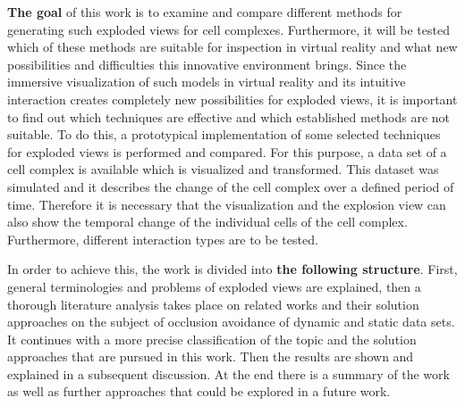 \textbf{The goal} of this work is to examine and compare different methods for generating such exploded views for cell complexes. Furthermore, it will be tested which of these methods are suitable for inspection in virtual reality and what new possibilities and difficulties this innovative environment brings.
Since the immersive visualization of such models in virtual reality and its intuitive interaction creates completely new possibilities for exploded views, it is important to find out which techniques are effective and which established methods are not suitable.
To do this, a prototypical implementation of some selected techniques for exploded views is performed and compared. 
For this purpose, a data set of a cell complex is available which is visualized and transformed. 
This dataset was simulated and it describes the change of the cell complex over a defined period of time. 
Therefore it is necessary that the visualization and the explosion view can also show the temporal change of the individual cells of the cell complex. Furthermore, different interaction types are to be tested. 

In order to achieve this, the work is divided into \textbf{the following structure}. 
First, general terminologies and problems of exploded views are explained, then a thorough literature analysis takes place on related works and their solution approaches on the subject of occlusion avoidance of dynamic and static data sets.
It continues with a more precise classification of the topic and the solution approaches that are pursued in this work. 
Then the results are shown and explained in a subsequent discussion. At the end there is a summary of the work as well as further approaches that could be explored in a future work.

